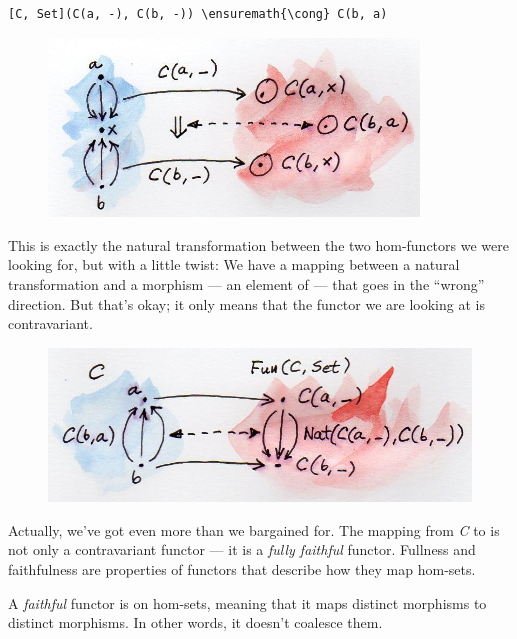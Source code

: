 \begin{Verbatim}[commandchars=\\\{\}]
[C, Set](C(a, -), C(b, -)) \ensuremath{\cong} C(b, a)
\end{Verbatim}

\begin{figure}[H]
\centering
\includegraphics[width=3.87500in]{images/yoneda-embedding.jpg}
\end{figure}

\noindent
This is exactly the natural transformation between the two hom-functors
we were looking for, but with a little twist: We have a mapping between
a natural transformation and a morphism --- an element of
 --- that goes in the ``wrong'' direction. But that's
okay; it only means that the functor we are looking at is contravariant.

\begin{figure}[H]
\centering
\includegraphics[width=\textwidth]{images/yoneda-embedding-2.jpg}
\end{figure}

\noindent
Actually, we've got even more than we bargained for. The mapping from
\emph{C} to \code{{[}C, Set{]}} is not only a contravariant functor
--- it is a \emph{fully faithful} functor. Fullness and faithfulness are
properties of functors that describe how they map hom-sets.

A \emph{faithful} functor is  on hom-sets, meaning that
it maps distinct morphisms to distinct morphisms. In other words, it
doesn't coalesce them.

